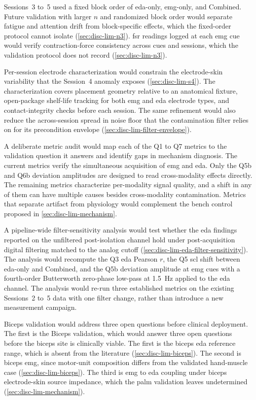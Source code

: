 Sessions~3 to~5 used a fixed block order of \gls{eda}-only, \gls{emg}-only, and Combined. Future validation with larger $n$ and randomized block order would separate fatigue and attention drift from block-specific effects, which the fixed-order protocol cannot isolate (\autoref{sec:disc-lim-n3}). \gls{fsr} readings logged at each \gls{emg} cue would verify contraction-force consistency across cues and sessions, which the validation protocol does not record (\autoref{sec:disc-lim-n3}).

Per-session electrode characterization would constrain the electrode-skin variability that the Session~4 anomaly exposes (\autoref{sec:disc-lim-s4}). The characterization covers placement geometry relative to an anatomical fixture, open-package shelf-life tracking for both \gls{emg} and \gls{eda} electrode types, and contact-integrity checks before each session. The same refinement would also reduce the across-session spread in noise floor that the contamination filter relies on for its precondition envelope (\autoref{sec:disc-lim-filter-envelope}).

A deliberate metric audit would map each of the Q1 to Q7 metrics to the validation question it answers and identify gaps in mechanism diagnosis. The current metrics verify the simultaneous acquisition of \gls{emg} and \gls{eda}. Only the Q5b and Q6b deviation amplitudes are designed to read cross-modality effects directly. The remaining metrics characterize per-modality signal quality, and a shift in any of them can have multiple causes besides cross-modality contamination. Metrics that separate artifact from physiology would complement the bench control proposed in \autoref{sec:disc-lim-mechanism}.

A pipeline-wide filter-sensitivity analysis would test whether the \gls{eda} findings reported on the unfiltered post-isolation channel hold under post-acquisition digital filtering matched to the analog cutoff (\autoref{sec:disc-lim-eda-filter-sensitivity}). The analysis would recompute the Q3 \gls{eda} Pearson \(r\), the Q5 \gls{scl} shift between \gls{eda}-only and Combined, and the Q5b deviation amplitude at \gls{emg} cues with a fourth-order Butterworth zero-phase low-pass at \SI{1.5}{\hertz} applied to the \gls{eda} channel. The analysis would re-run three established metrics on the existing Sessions~2 to~5 data with one filter change, rather than introduce a new measurement campaign.

Biceps validation would address three open questions before clinical deployment. The first is the Biceps validation, which would answer three open questions before the biceps site is clinically viable. The first is the biceps \gls{eda} reference range, which is absent from the literature (\autoref{sec:disc-lim-biceps}). The second is biceps \gls{emg}, since motor-unit composition differs from the validated hand-muscle case (\autoref{sec:disc-lim-biceps}). The third is \gls{emg} to \gls{eda} coupling under biceps electrode-skin source impedance, which the palm validation leaves undetermined (\autoref{sec:disc-lim-mechanism}).

